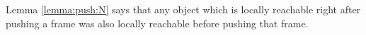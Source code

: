  Lemma \ref{lemma:push:N} says that %
any    object  which is locally reachable  {right after pushing a frame} was also locally reachable before 
pushing that frame. 
 
